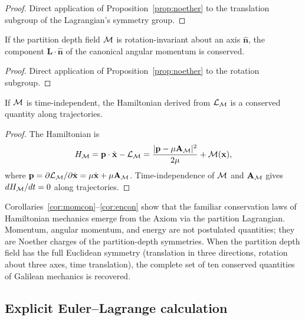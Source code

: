 \begin{proof}
Direct application of Proposition~\ref{prop:noether} to the translation subgroup of the Lagrangian's symmetry group.
\end{proof}

\begin{corollary}
\label{cor:angmom}
If the partition depth field $\mathcal{M}$ is rotation-invariant about an axis $\hat{\mathbf{n}}$, the component $\mathbf{L}\cdot\hat{\mathbf{n}}$ of the canonical angular momentum is conserved.
\end{corollary}

\begin{proof}
Direct application of Proposition~\ref{prop:noether} to the rotation subgroup.
\end{proof}

\begin{corollary}
\label{cor:encon}
If $\mathcal{M}$ is time-independent, the Hamiltonian derived from $\mathcal{L}_{\mathcal{M}}$ is a conserved quantity along trajectories.
\end{corollary}

\begin{proof}
The Hamiltonian is
\begin{equation*}
H_{\mathcal{M}}=\mathbf{p}\cdot\dot{\mathbf{x}}-\mathcal{L}_{\mathcal{M}}=\frac{|\mathbf{p}-\mu\mathbf{A}_{\mathcal{M}}|^{2}}{2\mu}+\mathcal{M}(\mathbf{x}),
\end{equation*}
where $\mathbf{p}=\partial\mathcal{L}_{\mathcal{M}}/\partial\dot{\mathbf{x}}=\mu\dot{\mathbf{x}}+\mu\mathbf{A}_{\mathcal{M}}$. Time-independence of $\mathcal{M}$ and $\mathbf{A}_{\mathcal{M}}$ gives $dH_{\mathcal{M}}/dt=0$ along trajectories.
\end{proof}

\begin{remark}
Corollaries~\ref{cor:momcon}--\ref{cor:encon} show that the familiar conservation laws of Hamiltonian mechanics emerge from the Axiom via the partition Lagrangian. Momentum, angular momentum, and energy are not postulated quantities; they are Noether charges of the partition-depth symmetries. When the partition depth field has the full Euclidean symmetry (translation in three directions, rotation about three axes, time translation), the complete set of ten conserved quantities of Galilean mechanics is recovered.
\end{remark}

\subsection{Explicit Euler--Lagrange calculation}

